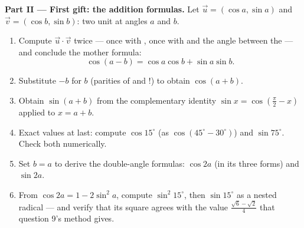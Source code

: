 \begin{problem}
\medskip
\noindent\textbf{Part II --- First gift: the addition
formulas.}
Let $\vec u = (\cos a, \sin a)$ and $\vec v = (\cos b, \sin b)$:
two unit  at angles $a$ and $b$.
\begin{enumerate}[resume]
  \item Compute $\vec u \cdot \vec v$ twice --- once with
        , once with  and the angle between the
         --- and conclude the mother formula:
        \[
        \cos(a - b) = \cos a \cos b + \sin a \sin b .
        \]
  \item Substitute $-b$ for $b$ (parities of  and !)
        to obtain $\cos(a + b)$.
  \item Obtain $\sin(a + b)$ from the complementary identity
        $\sin x = \cos\left(\frac\pi2 - x\right)$ applied to
        $x = a + b$.
  \item Exact values at last: compute $\cos 15^\circ$ (as
        $\cos(45^\circ - 30^\circ)$) and $\sin 75^\circ$. Check
        both numerically.
  \item Set $b = a$ to derive the double-angle formulas:
        $\cos 2a$ (in its three forms) and $\sin 2a$.
  \item From $\cos 2a = 1 - 2\sin^2 a$, compute
        $\sin^2 15^\circ$, then $\sin 15^\circ$ as a nested
        radical --- and verify that its square agrees with the
        value $\frac{\sqrt6 - \sqrt2}{4}$ that question 9's
        method gives.
\end{enumerate}


\end{problem}
